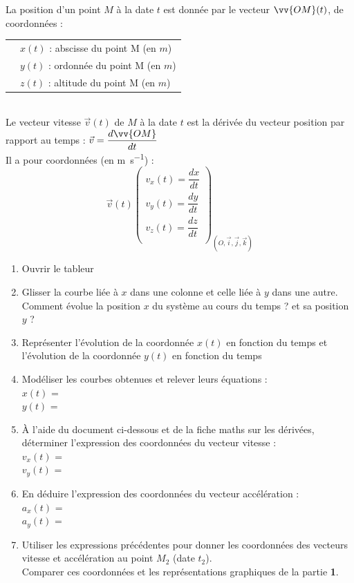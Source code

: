 \documentclass[a4paper,11pt,fleqn]{article}%
\begin{document}
La position d'un point $M$ à la date $t$ est donnée par le vecteur $\vv{OM}(t)$, de coordonnées :\\
	\begin{tabular}{>{\centering}m{6cm} | m{13cm}}
	\multirow{2}{5cm}{\begin{eqnarray}
	\vv{OM}(t) \left\{ 
	\begin{array}{l} x(t) \\ y(t) \\ z(t) \\ 
	\end{array} \right\} _{(O, \vec{i}, \vec{j}, \vec{k})} 	\nonumber
	\end{eqnarray}} & $x(t)$ : abscisse du point M (en $m$)\rule[.75cm]{0cm}{0cm}\\
	& $y(t)$ : ordonnée du point M (en $m$)\rule[.75cm]{0cm}{0cm}\\
	& $z(t)$ : altitude du point M (en $m$)\rule[.75cm]{0cm}{0cm}\\
	\end{tabular}\\
Le vecteur vitesse $\vec{v}(t)$ de $M$ à la date $t$ est la dérivée du vecteur position par rapport au temps : $\vec{v}=\dfrac{d \vv{OM}}{dt}$\\
Il a pour coordonnées (en \unit{\meter\per\second}) :\\
$$\vec{v}(t)
	\left( 
	\begin{array}{l} v_x(t)=\dfrac{dx}{dt} \\ v_y(t)=\dfrac{dy}{dt} \\ v_z(t)=\dfrac{dz}{dt} \\ 
	\end{array} 
	\right) _{(O, \vec{i}, \vec{j}, \vec{k})}$$
\begin{enumerate}[resume]
	\item Ouvrir le tableur
	\item Glisser la courbe liée à $x$ dans une colonne et celle liée à $y$ dans une autre. Comment évolue la position $x$ du système au cours du temps ? et sa position $y$ ?
	\item Représenter l'évolution de la coordonnée $x(t)$ en fonction du temps et l'évolution de la coordonnée $y(t)$ en fonction du temps
	\item Modéliser les courbes obtenues et relever leurs équations :\\
	$x(t)$ =\\
	$y(t)$ =
	\item À l'aide du document ci-dessous et de la fiche maths sur les dérivées, déterminer l'expression des coordonnées du vecteur vitesse :\\
	$v_x(t)$ =\\
	$v_y(t)$ =
	\item En déduire l'expression des coordonnées du vecteur accélération : \\
	$a_x(t)$ =\\
	$a_y(t)$ =
	\item Utiliser les expressions précédentes pour donner les coordonnées des vecteurs vitesse et accélération au point $M_2$ (date $t_2$).\\
	Comparer ces coordonnées et les représentations graphiques de la partie \textbf{1}.
\end{enumerate}
\end{document}
